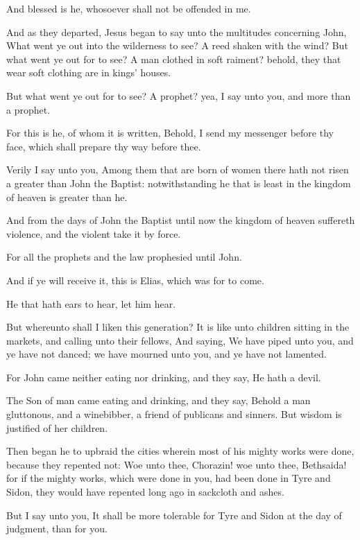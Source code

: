 \Verse And blessed is he, whosoever shall not be offended in me.

\Verse And as they departed, Jesus began to say unto the multitudes concerning John, What went ye out into the wilderness to see? A reed shaken with the wind?  \Verse But what went ye out for to see? A man clothed in soft raiment?  behold, they that wear soft clothing are in kings' houses.

\Verse But what went ye out for to see? A prophet? yea, I say unto you, and more than a prophet.

\Verse For this is he, of whom it is written, Behold, I send my messenger before thy face, which shall prepare thy way before thee.

\Verse Verily I say unto you, Among them that are born of women there hath not risen a greater than John the Baptist: notwithstanding he that is least in the kingdom of heaven is greater than he.

\Verse And from the days of John the Baptist until now the kingdom of heaven suffereth violence, and the violent take it by force.

\Verse For all the prophets and the law prophesied until John.

\Verse And if ye will receive it, this is Elias, which was for to come.

\Verse He that hath ears to hear, let him hear.

\Verse But whereunto shall I liken this generation? It is like unto children sitting in the markets, and calling unto their fellows, \Verse And saying, We have piped unto you, and ye have not danced; we have mourned unto you, and ye have not lamented.

\Verse For John came neither eating nor drinking, and they say, He hath a devil.

\Verse The Son of man came eating and drinking, and they say, Behold a man gluttonous, and a winebibber, a friend of publicans and sinners.  But wisdom is justified of her children.

\Verse Then began he to upbraid the cities wherein most of his mighty works were done, because they repented not: \Verse Woe unto thee, Chorazin! woe unto thee, Bethsaida! for if the mighty works, which were done in you, had been done in Tyre and Sidon, they would have repented long ago in sackcloth and ashes.

\Verse But I say unto you, It shall be more tolerable for Tyre and Sidon at the day of judgment, than for you.


